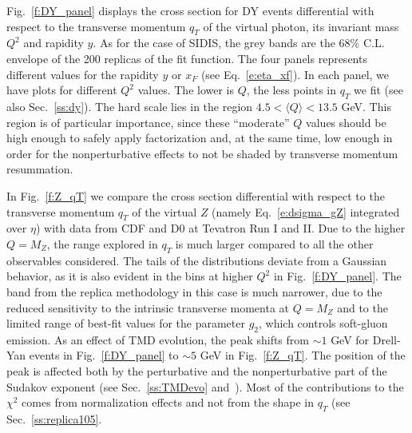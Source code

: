 \documentclass[aps,preprintnumbers,showpacs,nofootinbib,superscriptaddress,floatfix]{revtex4}
\begin{document}

Fig.~\ref{f:DY_panel} displays the cross section for DY events differential with respect to the transverse momentum $q_T$ of the virtual photon, its invariant mass $Q^2$ and rapidity $y$.  
As for the case of SIDIS, the grey bands are the $68\%$ C.L. envelope of the
200 replicas of the fit function. The four panels represents different values
for the rapidity $y$ or $x_F$ (see Eq.~\eqref{e:eta_xf}). In each panel, we have plots for different $Q^2$ values.
The lower is $Q$, the less points in $q_T$ we fit (see also Sec.~\ref{ss:dy}). 
The hard scale lies in the region $4.5 < \langle Q \rangle < 13.5$ GeV. This
region is of particular importance, since these ``moderate'' $Q$ values should
be high enough to safely apply factorization and, at the same time, low enough
in order for the nonperturbative effects to not be shaded by transverse
momentum resummation. 

In Fig.~\ref{f:Z_qT} we compare the cross section differential with respect to the transverse momentum $q_T$ of the virtual $Z$ (namely Eq.~\eqref{e:dsigma_gZ} integrated over $\eta$) with data from CDF and D0 at Tevatron Run I and II. 
Due to the higher $Q = M_Z$, the range explored in $q_T$ is much larger compared to all the other observables considered. The tails of the distributions deviate from a Gaussian behavior, as it is also evident in the bins at higher $Q^2$ in Fig.~\ref{f:DY_panel}. The band from the replica methodology in this case is much narrower, due to the reduced sensitivity to the intrinsic transverse momenta at $Q=M_Z$ and to the limited range of best-fit values for the parameter $g_2$, which controls soft-gluon emission. 
As an effect of TMD evolution, the peak shifts from $\sim 1$ GeV for Drell-Yan events in Fig.~\ref{f:DY_panel} to $\sim 5$ GeV in Fig.~\ref{f:Z_qT}. The position of the peak is affected both by the perturbative and the nonperturbative part of the Sudakov exponent (see Sec.~\ref{ss:TMDevo} and~\cite{Signori:2016lvd}).
Most of the contributions to the $\chi^2$ comes from normalization effects and
not from the shape in $q_T$ (see Sec.~\ref{ss:replica105}. 
\end{document}

